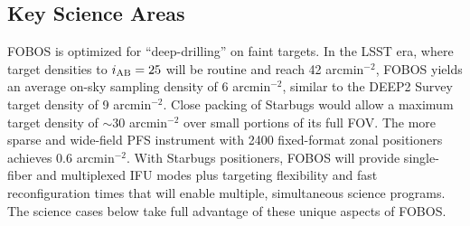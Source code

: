 

\subsection{Key Science Areas}

FOBOS is optimized for ``deep-drilling'' on faint targets. In the
LSST era, where target densities to $i_{\rm AB} = 25$ will be routine
and reach 42 arcmin$^{-2}$, FOBOS yields an average on-sky sampling
density of 6 arcmin$^{-2}$, similar to the DEEP2 Survey target
density of 9 arcmin$^{-2}$. Close packing of Starbugs would allow a
maximum target density of $\sim$30 arcmin$^{-2}$ over small portions
of its full FOV. The more sparse and wide-field PFS instrument with
2400 fixed-format zonal positioners achieves 0.6 arcmin$^{-2}$. With
Starbugs positioners, FOBOS will provide single-fiber and multiplexed
IFU modes plus targeting flexibility and fast reconfiguration times
that will enable multiple, simultaneous science programs. The science
cases below take full advantage of these unique aspects of FOBOS.


